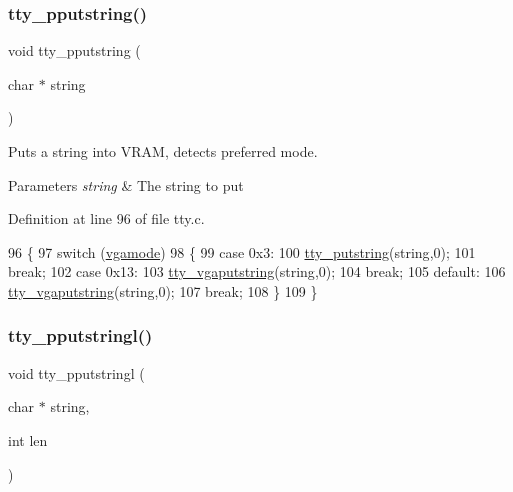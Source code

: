 \subsubsection{\texorpdfstring{tty\+\_\+pputstring()}{tty\_pputstring()}}
{\footnotesize\ttfamily void tty\+\_\+pputstring (\begin{DoxyParamCaption}\item[{char $\ast$}]{string }\end{DoxyParamCaption})}



Puts a string into V\+R\+AM, detects preferred mode. 


\begin{DoxyParams}{Parameters}
{\em string} & The string to put \\
\hline
\end{DoxyParams}


Definition at line 96 of file tty.\+c.


\begin{DoxyCode}
96                                   \{
97     \textcolor{keywordflow}{switch} (\hyperlink{a00167_af93b0649fdd1bea5b6d29ed37205aa2c_af93b0649fdd1bea5b6d29ed37205aa2c}{vgamode})
98     \{
99     \textcolor{keywordflow}{case} 0x3:
100         \hyperlink{a00167_a5b5bf610a57f3c59b2851fa2652081ec_a5b5bf610a57f3c59b2851fa2652081ec}{tty\_putstring}(\textcolor{keywordtype}{string},0);
101         \textcolor{keywordflow}{break};
102     \textcolor{keywordflow}{case} 0x13:
103         \hyperlink{a00167_a05ca3f5e64f38fec173b635ca8465415_a05ca3f5e64f38fec173b635ca8465415}{tty\_vgaputstring}(\textcolor{keywordtype}{string},0);
104         \textcolor{keywordflow}{break};
105     \textcolor{keywordflow}{default}:
106         \hyperlink{a00167_a05ca3f5e64f38fec173b635ca8465415_a05ca3f5e64f38fec173b635ca8465415}{tty\_vgaputstring}(\textcolor{keywordtype}{string},0);
107         \textcolor{keywordflow}{break};
108     \}
109 \}
\end{DoxyCode}
\mbox{\label{a00167_abaf93f9e56ddb7b10462070f59e534e4_abaf93f9e56ddb7b10462070f59e534e4}} 
\subsubsection{\texorpdfstring{tty\+\_\+pputstringl()}{tty\_pputstringl()}}
{\footnotesize\ttfamily void tty\+\_\+pputstringl (\begin{DoxyParamCaption}\item[{char $\ast$}]{string,  }\item[{int}]{len }\end{DoxyParamCaption})}



